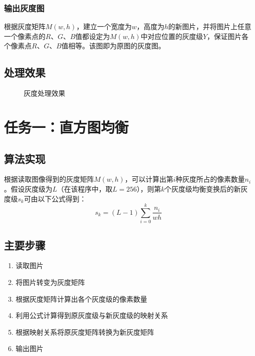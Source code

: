 \documentclass[UTF8]{ctexart}
\begin{document}
			\subsubsection{输出灰度图}
			根据灰度矩阵$M(w,h)$，建立一个宽度为$w$，高度为$h$的新图片，并将图片上任意一个像素点的$R$、$G$、$B$值都设定为$M(w,h)$中对应位置的灰度级$Y$，保证图片各个像素点$R$、$G$、$B$值相等。该图即为原图的灰度图。
		\subsection{处理效果}

		\begin{figure}[H]
		\centering
		\caption{灰度处理效果}
		\end{figure}


	\section{任务一：直方图均衡}
		\subsection{算法实现}
		根据读取图像得到的灰度矩阵$M(w,h)$，可以计算出第$i$种灰度所占的像素数量$n_i$。假设灰度级为$L$（在该程序中，取$L=256$），则第$k$个灰度级均衡变换后的新灰度级$s_k$可由以下公式得到：
		\[ s_k=(L-1)\sum_{i=0}^k\frac{n_i}{wh} \]

		\subsection{主要步骤}
			\begin{enumerate} [(1)]
				\item 读取图片
				\item 将图片转变为灰度矩阵
				\item 根据灰度矩阵计算出各个灰度级的像素数量
				\item 利用公式计算得到原灰度级与新灰度级的映射关系
				\item 根据映射关系将原灰度矩阵转换为新灰度矩阵
				\item 输出图片
			\end{enumerate}
\end{document}
